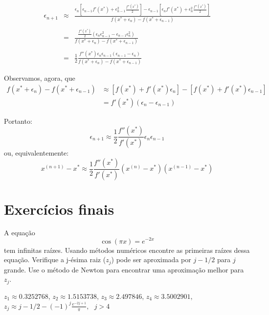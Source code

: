 \begin{Answer}
\begin{eqnarray*}
\epsilon_{n+1}
 &\approx&\frac{\epsilon_n \left[\epsilon_{n-1} f'(x^*) + \epsilon_{n-1}^2 \frac{f''(x^*)}{2}\right]-\epsilon_{n-1}\left[\epsilon_{n} f'(x^*) + \epsilon_{n}^2 \frac{f''(x^*)}{2}\right]}{f(x^*+\epsilon_n)-f(x^*+\epsilon_{n-1})}\\
~\\ &=&\frac{\frac{f''(x^*)}{2}\left(\epsilon_{n}\epsilon_{n-1}^2-\epsilon_{n-1}\epsilon_{n}^2\right)}{f(x^*+\epsilon_n)-f(x^*+\epsilon_{n-1})}\\
~\\ &=&\frac{1}{2}\frac{{f''(x^*)}\epsilon_{n}\epsilon_{n-1}\left(\epsilon_{n-1}-\epsilon_{n}\right)}{f(x^*+\epsilon_n)-f(x^*+\epsilon_{n-1})}
\end{eqnarray*}

Observamos, agora, que
\begin{equation}
  \begin{split}
  f(x^*+\epsilon_n)-f(x^*+\epsilon_{n-1}) &\approx \left[f(x^*)+f'(x^*)\epsilon_n\right]-\left[f(x^*)+f'(x^*)\epsilon_{n-1}\right] \\
  &=f'(x^*)(\epsilon_n-\epsilon_{n-1})  
  \end{split}  
\end{equation}

Portanto:
\begin{equation}
  \epsilon_{n+1}\approx \frac{1}{2}\frac{f''(x^*)}{f'(x^*)} \epsilon_n \epsilon_{n-1}
\end{equation}
ou, equivalentemente:
\begin{equation}
  x^{(n+1)}-x^*\approx \frac{1}{2}\frac{f''(x^*)}{f'(x^*)} \left(x^{(n)}-x^*\right) \left(x^{(n-1)}-x^*\right)
\end{equation}  
\end{Answer}

\section*{Exercícios finais}

\begin{Exercise} A equação $$\cos(\pi x)=e^{-2x}$$ tem infinitas raízes.
Usando  métodos numéricos encontre as primeiras raízes dessa equação. Verifique a j-ésima raiz ($z_j$) pode ser aproximada por $j-1/2$ para $j$ grande. Use o método de Newton para encontrar uma aproximação melhor para $z_j$.
\end{Exercise}
\begin{Answer}
  \begin{tiny}
 $z_1\approx 0.3252768 $, $z_2\approx 1.5153738$, $z_3\approx 2.497846  $, $z_4\approx 3.5002901$, $z_j\approx j-1/2-(-1)^j\frac{e^{-2j+1}}{\pi}, ~~~j>4$    
  \end{tiny}
\end{Answer}


